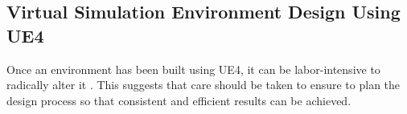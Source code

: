 


\subsection{Virtual Simulation Environment Design Using UE4}
Once an environment has been built using UE4, it can be labor-intensive to radically alter it \cite[p.~454]{Rouse2004GamePractice}. This suggests that care should be taken to ensure to plan the design process so that consistent and efficient results can be achieved.

